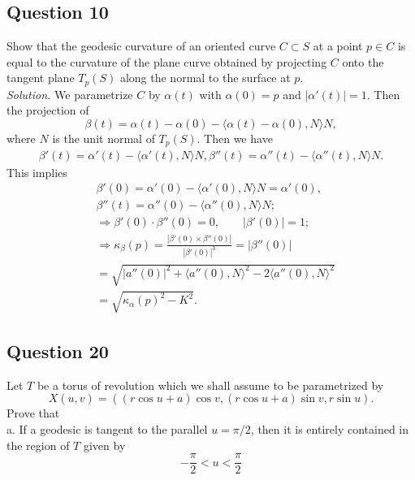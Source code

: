 \documentclass[12pt]{article}
\begin{document}
\subsection*{Question 10}
Show that the geodesic curvature of an oriented curve $C \subset S$ at a point $p \in C$ is equal to the curvature of the plane curve obtained by projecting $C$ onto the tangent plane $T_p(S)$ along the normal to the surface at $p$.\\

\textit{Solution.} We parametrize $C$ by $\alpha(t)$ with $\alpha(0)=p$ and $|\alpha'(t)|=1$. Then the projection of 
\begin{equation*}
    \beta(t) = \alpha(t)-\alpha(0) - \langle\alpha(t)-\alpha(0),N\rangle N,
\end{equation*}
where $N$ is the unit normal of $T_p(S)$. Then we have\begin{align*}
    \beta'(t) = \alpha'(t) - \langle\alpha'(t),N\rangle N,
    \beta''(t) = \alpha''(t) - \langle\alpha''(t),N\rangle N.
\end{align*} 
This implies \begin{align*}
    &\beta'(0) = \alpha'(0) - \langle\alpha'(0),N\rangle N = \alpha'(0),\\
    &\beta''(t) = \alpha''(0) - \langle \alpha''(0),N\rangle N;\\
    &\Rightarrow  \beta'(0)\cdot \beta''(0)= 0,\qquad |\beta'(0)|=1;\\
    &\Rightarrow  \kappa_{\beta}(p) =  \frac{|\beta'(0)\times\beta''(0)|}{|\beta'(0)|^3}=|\beta''(0)|\\
    &= \sqrt{|a''(0)|^2+\langle a''(0),N\rangle^2-2\langle a''(0),N\rangle^2}\\
    &=\sqrt{\kappa_\alpha(p)^2-K^2}.
\end{align*}

\subsection*{Question 20}
Let $T$ be a torus of revolution which we shall assume to be parametrized by \begin{equation*}
    X(u, v)=((r\cos u+a)\cos v,(r\cos u+a)\sin v,r\sin u).
\end{equation*}
Prove that\\

a. If a geodesic is tangent to the parallel $u = \pi/2$, then it is entirely contained in the region of $T$ given by\begin{equation*}
    -\frac{\pi}{2}<u<\frac{\pi}{2}
\end{equation*}
\end{document}
